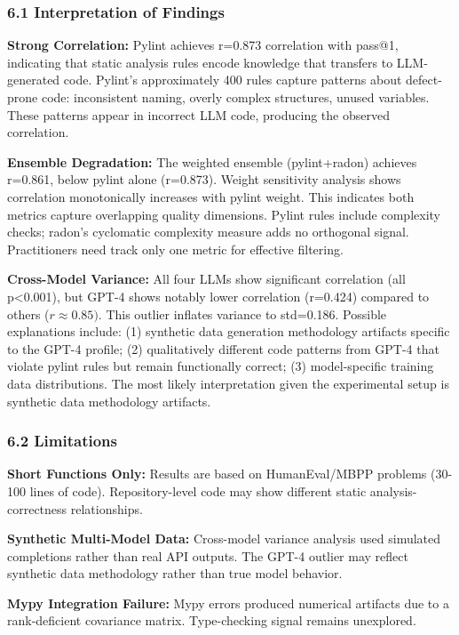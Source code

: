 
\subsubsection{6.1 Interpretation of Findings}

\textbf{Strong Correlation:} Pylint achieves r=0.873 correlation with pass@1, indicating that static analysis rules encode knowledge that transfers to LLM-generated code. Pylint's approximately 400 rules capture patterns about defect-prone code: inconsistent naming, overly complex structures, unused variables. These patterns appear in incorrect LLM code, producing the observed correlation.

\textbf{Ensemble Degradation:} The weighted ensemble (pylint+radon) achieves r=0.861, below pylint alone (r=0.873). Weight sensitivity analysis shows correlation monotonically increases with pylint weight. This indicates both metrics capture overlapping quality dimensions. Pylint rules include complexity checks; radon's cyclomatic complexity measure adds no orthogonal signal. Practitioners need track only one metric for effective filtering.

\textbf{Cross-Model Variance:} All four LLMs show significant correlation (all p<0.001), but GPT-4 shows notably lower correlation (r=0.424) compared to others ($r\approx 0.85)$. This outlier inflates variance to std=0.186. Possible explanations include: (1) synthetic data generation methodology artifacts specific to the GPT-4 profile; (2) qualitatively different code patterns from GPT-4 that violate pylint rules but remain functionally correct; (3) model-specific training data distributions. The most likely interpretation given the experimental setup is synthetic data methodology artifacts.

\subsubsection{6.2 Limitations}

\textbf{Short Functions Only:} Results are based on HumanEval/MBPP problems (30-100 lines of code). Repository-level code may show different static analysis-correctness relationships.

\textbf{Synthetic Multi-Model Data:} Cross-model variance analysis used simulated completions rather than real API outputs. The GPT-4 outlier may reflect synthetic data methodology rather than true model behavior.

\textbf{Mypy Integration Failure:} Mypy errors produced numerical artifacts due to a rank-deficient covariance matrix. Type-checking signal remains unexplored.

